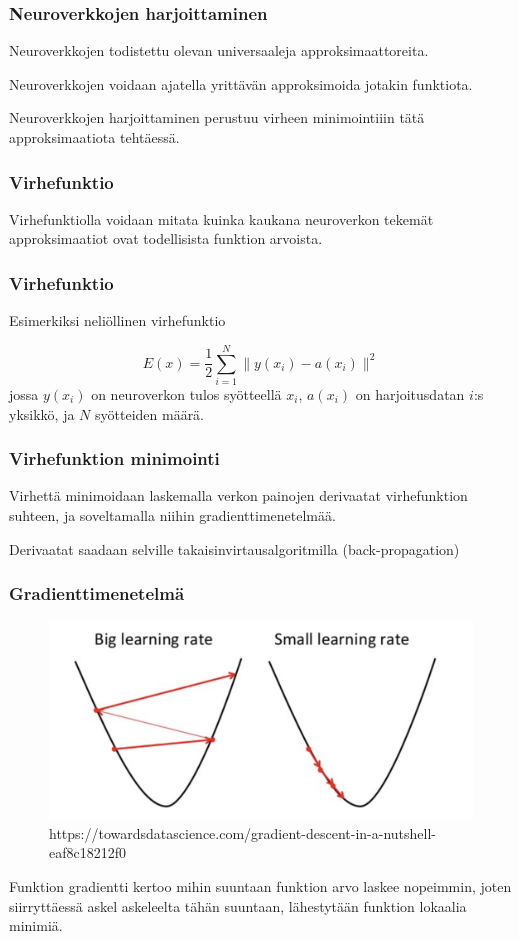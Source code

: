 \documentclass{beamer}
\begin{document}
\begin{frame}
    \frametitle{Neuroverkkojen harjoittaminen}
    Neuroverkkojen todistettu olevan universaaleja approksimaattoreita.

    Neuroverkkojen voidaan ajatella yrittävän approksimoida jotakin funktiota.

    Neuroverkkojen harjoittaminen perustuu virheen minimointiiin tätä approksimaatiota tehtäessä.
\end{frame}

\begin{frame}
    \frametitle{Virhefunktio}

    Virhefunktiolla voidaan mitata kuinka kaukana neuroverkon tekemät approksimaatiot ovat
    todellisista funktion arvoista.

\end{frame}

\begin{frame}
    \frametitle{Virhefunktio}
    Esimerkiksi neliöllinen virhefunktio

    $$E(x) = \frac{1}{2} \sum_{i=1}^{N} \| y(x_i)-a(x_i) \|^2$$
  jossa $y(x_i)$ on neuroverkon tulos syötteellä $x_i$, $a(x_i)$ on harjoitusdatan $i$:s yksikkö, ja $N$ syötteiden määrä.

\end{frame}

\begin{frame}
    \frametitle{Virhefunktion minimointi}
    Virhettä minimoidaan laskemalla verkon painojen derivaatat virhefunktion suhteen,
    ja soveltamalla niihin gradienttimenetelmää.

    Derivaatat saadaan selville takaisinvirtausalgoritmilla (back-propagation)
\end{frame}

\begin{frame}
    \frametitle{Gradienttimenetelmä}
    \begin{figure}[h]
        \label{pic:gradient_descent}
        \centering
        \includegraphics[scale=0.15]{gradient_descent}
        \caption{https://towardsdatascience.com/gradient-descent-in-a-nutshell-eaf8c18212f0}
    \end{figure}

    Funktion gradientti kertoo mihin suuntaan funktion arvo laskee nopeimmin, joten siirryttäessä
    askel askeleelta tähän suuntaan, lähestytään funktion lokaalia minimiä.

\end{frame}
\end{document}
